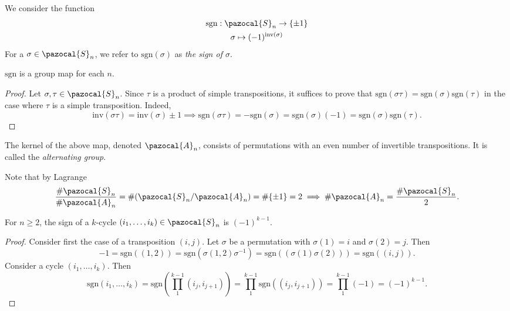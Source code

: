 \begin{definition}
    We consider the function 
    \begin{gather*}
        \mathrm{sgn} : \pazocal{S}_n \rightarrow \{\pm 1\}\\
        \sigma \mapsto (-1)^{\mathrm{inv}(\sigma)}
    \end{gather*}
    For a $\sigma \in \pazocal{S}_n$, we refer to $\mathrm{sgn}(\sigma)$ as \emph{the sign of $\sigma$}. 
\end{definition}
\begin{lemma}
    $\mathrm{sgn}$ is a group map for each $n$. 
\end{lemma}
\begin{proof}
    Let $\sigma,\tau\in \pazocal{S}_n$. Since $\tau$ is a product of simple transpositions, it suffices to prove that $\mathrm{sgn}(\sigma\tau)=\mathrm{sgn}(\sigma)\mathrm{sgn}(\tau)$ in the case where $\tau$ is a simple transposition. Indeed, 
    $$
        \mathrm{inv}(\sigma \tau)=\mathrm{inv}(\sigma)\pm 1\implies \mathrm{sgn}(\sigma\tau)= -\mathrm{sgn}(\sigma)=\mathrm{sgn}(\sigma)(-1)=\mathrm{sgn}(\sigma)\mathrm{sgn}(\tau).
    $$
\end{proof}
\begin{definition}
    The kernel of the above map, denoted $\pazocal{A}_n$, consists of permutations with an even number of invertible transpositions. It is called the \emph{alternating group}.
\end{definition}
\begin{remark}
    Note that by Lagrange 
    $$
        \frac{\#\pazocal{S}_n}{\#\pazocal{A}_n} = \#(\pazocal{S}_n/\pazocal{A}_n)= \#\{\pm 1\} = 2 \implies \#\pazocal{A}_n = \frac{\#\pazocal{S}_n}{2}.
    $$
\end{remark}
\begin{lemma}
    For $n\geq 2$, the sign of a $k$-cycle $(i_1,\dots,i_k)\in \pazocal{S}_n$ is $(-1)^{k-1}$. 
\end{lemma}
\begin{proof}
    Consider first the case of a transposition $(i,j)$. Let $\sigma$ be a permutation with $\sigma(1)=i$ and $\sigma(2)=j$. Then 
    $$
        -1 = \mathrm{sgn}((1,2))= \mathrm{sgn}\left(\sigma (1,2)\sigma^{-1}\right)=\mathrm{sgn}((\sigma(1)\sigma(2)))=\mathrm{sgn}((i,j)).
    $$
    Consider a cycle $(i_1,\dots,i_k)$. Then 
    $$
        \mathrm{sgn}(i_1,\dots,i_k) = \mathrm{sgn}\left(\prod_1^{k-1} (i_j,i_{j+1})\right) = \prod_1^{k-1}\mathrm{sgn}((i_j,i_{j+1})) = \prod_1^{k-1} (-1) = (-1)^{k-1}.
    $$
\end{proof}
